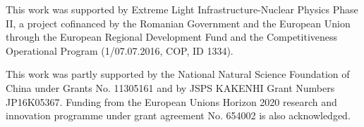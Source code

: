 \documentclass[prc,twocolumn,twoside,showpacs,superscriptaddress,floatfix]{revtex4-1}
\begin{document}
{}

This work was supported by Extreme Light Infrastructure-Nuclear
Physics Phase II, a project cofinanced by the Romanian Government
and the European Union through the European Regional Development
Fund and the Competitiveness Operational Program (1/07.07.2016,
COP, ID 1334).

This work was partly supported by the National Natural Science Foundation of China
under Grants No. 11305161 and by JSPS KAKENHI Grant Numbers JP16K05367.
Funding from the European Unions Horizon 2020 research and innovation
programme under grant agreement No. 654002 is also
acknowledged.

\clearpage

\end{document}

